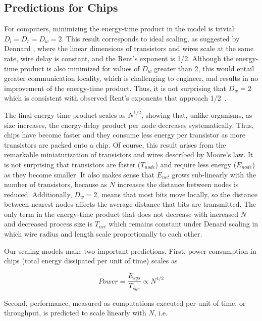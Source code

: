 \documentclass[12pt]{article}
\begin{document}
\subsection{Predictions for Chips}
\label{sec:comp-predictions}


For computers, minimizing the energy-time product in the model is trivial: $D_l=D_r=D_w =
2$. This result corresponds to ideal scaling, as suggested by Dennard
\cite{dennard74}, where the linear dimensions of transistors and wires scale at
the same rate, wire delay is constant, and the Rent's exponent is 1/2.  Although
the energy-time product is also minimized for values of $D_w$ greater than 2,
this would entail greater communication locality, which is challenging
to engineer, and results in no
improvement of the energy-time product.  Thus, it is not surprising
that $D_w = 2$ which is consistent with observed
Rent's exponents that approach 1/2~\cite{yang2001wirelength, solee2013evolutionary}. 


The final energy-time product scales as $N^{1/2}$, showing that, unlike
organisms, as size increases, the energy-delay product per node decreases
systematically.  Thus, chips have become faster and they consume less energy per
transistor as more transistors are packed onto a chip. Of course, this
result arises 
from the remarkable miniaturization of transistors and wires described by
Moore's law. It is not surprising that transistors are faster ($T_{node}$) and
require less energy ($E_{node}$) as they become smaller. It also makes sense
that  $E_{net}$ grows sub-linearly with the number of transistors, because as
$N$ increases the distance between nodes is reduced. Additionally, $D_w = 2$,
means that most bits move locally, so the distance between nearest nodes
affects the average distance that bits are transmitted.  The only term in the
energy-time product that does not decrease with increased $N$ and decreased
process size is $T_{net}$ which remains constant under Denard scaling in which
wire radius and length scale proportionally to each other.

Our scaling models make two important predictions.  First, power
consumption in chips (total energy dissipated per unit of time) scales as

\begin{equation}
\label{eq:Power}
Power = \frac{E_{sys}}{T_{sys}} \propto N^{1/2} 
\end{equation}
 
\noindent Second, performance,
measured as computations executed per unit of time, or throughput, is predicted
to scale linearly with $N$,  i.e.  
\end{document}
